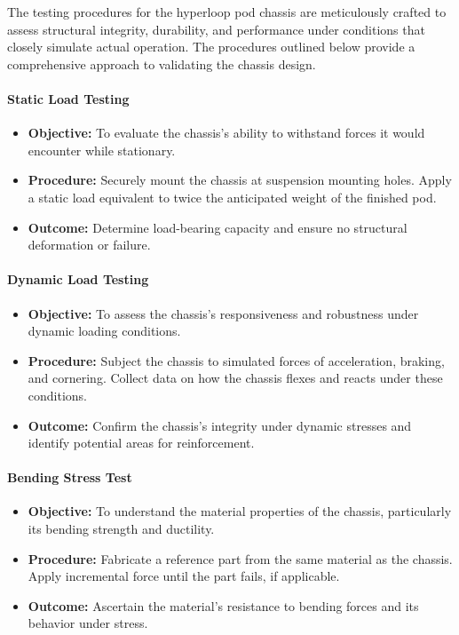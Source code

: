 The testing procedures for the hyperloop pod chassis are meticulously crafted to assess structural integrity, durability, and performance under conditions that closely simulate actual operation. The procedures outlined below provide a comprehensive approach to validating the chassis design.

\paragraph{Static Load Testing}
\begin{itemize}
    \item \textbf{Objective:} To evaluate the chassis's ability to withstand forces it would encounter while stationary.
    \item \textbf{Procedure:} Securely mount the chassis at suspension mounting holes. Apply a static load equivalent to twice the anticipated weight of the finished pod.
    \item \textbf{Outcome:} Determine load-bearing capacity and ensure no structural deformation or failure.
\end{itemize}

\paragraph{Dynamic Load Testing}
\begin{itemize}
    \item \textbf{Objective:} To assess the chassis's responsiveness and robustness under dynamic loading conditions.
    \item \textbf{Procedure:} Subject the chassis to simulated forces of acceleration, braking, and cornering. Collect data on how the chassis flexes and reacts under these conditions.
    \item \textbf{Outcome:} Confirm the chassis's integrity under dynamic stresses and identify potential areas for reinforcement.
\end{itemize}

\paragraph{Bending Stress Test}
\begin{itemize}
    \item \textbf{Objective:} To understand the material properties of the chassis, particularly its bending strength and ductility.
    \item \textbf{Procedure:} Fabricate a reference part from the same material as the chassis. Apply incremental force until the part fails, if applicable.
    \item \textbf{Outcome:} Ascertain the material's resistance to bending forces and its behavior under stress.
\end{itemize}

